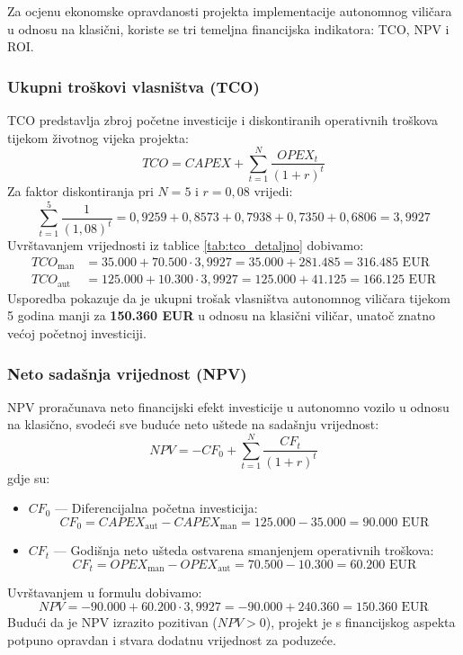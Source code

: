 Za ocjenu ekonomske opravdanosti projekta implementacije autonomnog viličara u odnosu na klasični, koriste se tri temeljna financijska indikatora: TCO, NPV i ROI.

\subsubsection{Ukupni troškovi vlasništva (TCO)}
TCO predstavlja zbroj početne investicije i diskontiranih operativnih troškova tijekom životnog vijeka projekta:
\begin{equation}
    TCO = CAPEX + \sum_{t=1}^{N} \frac{OPEX_t}{(1 + r)^t}
\end{equation}
Za faktor diskontiranja pri $N=5$ i $r=0,08$ vrijedi:
\begin{equation*}
    \sum_{t=1}^{5} \frac{1}{(1,08)^t} = 0,9259 + 0,8573 + 0,7938 + 0,7350 + 0,6806 = 3,9927
\end{equation*}
Uvrštavanjem vrijednosti iz tablice \ref{tab:tco_detaljno} dobivamo:
\begin{align}
    TCO_{\text{man}} &= 35.000 + 70.500 \cdot 3,9927 = 35.000 + 281.485 = 316.485\text{ EUR} \\
    TCO_{\text{aut}} &= 125.000 + 10.300 \cdot 3,9927 = 125.000 + 41.125 = 166.125\text{ EUR}
\end{align}
Usporedba pokazuje da je ukupni trošak vlasništva autonomnog viličara tijekom 5 godina manji za \textbf{150.360 EUR} u odnosu na klasični viličar, unatoč znatno većoj početnoj investiciji.

\subsubsection{Neto sadašnja vrijednost (NPV)}
NPV proračunava neto financijski efekt investicije u autonomno vozilo u odnosu na klasično, svodeći sve buduće neto uštede na sadašnju vrijednost:
\begin{equation}
    NPV = -CF_0 + \sum_{t=1}^{N} \frac{CF_t}{(1 + r)^t}
\end{equation}
gdje su:
\begin{itemize}
    \item $CF_0$ — Diferencijalna početna investicija:
    \begin{equation*}
        CF_0 = CAPEX_{\text{aut}} - CAPEX_{\text{man}} = 125.000 - 35.000 = 90.000\text{ EUR}
    \end{equation*}
    \item $CF_t$ — Godišnja neto ušteda ostvarena smanjenjem operativnih troškova:
    \begin{equation*}
        CF_t = OPEX_{\text{man}} - OPEX_{\text{aut}} = 70.500 - 10.300 = 60.200\text{ EUR}
    \end{equation*}
\end{itemize}
Uvrštavanjem u formulu dobivamo:
\begin{equation}
    NPV = -90.000 + 60.200 \cdot 3,9927 = -90.000 + 240.360 = 150.360\text{ EUR}
\end{equation}
Budući da je NPV izrazito pozitivan ($NPV > 0$), projekt je s financijskog aspekta potpuno opravdan i stvara dodatnu vrijednost za poduzeće.

